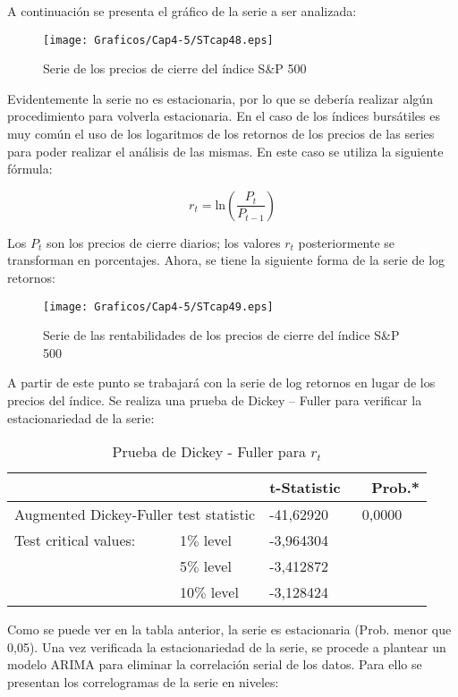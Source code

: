 A continuaci\'{o}n se presenta el gr\'{a}fico de la serie a ser analizada:

\begin{figure}[H]
\centering
\texttt{[image: Graficos/Cap4-5/STcap48.eps]}
\caption{Serie de los precios de cierre del \'{i}ndice S{\&}P 500}
\end{figure}

Evidentemente la serie no es estacionaria, por lo que se deber\'{i}a realizar alg\'{u}n procedimiento para volverla estacionaria. En el caso de los \'{i}ndices burs\'{a}tiles es muy com\'{u}n el uso de los logaritmos de los retornos de los precios de las series para poder realizar el an\'{a}lisis de las mismas. En este caso se utiliza la siguiente f\'{o}rmula:

\[
r_{t}=\mathrm{ln}\left( \frac{P_{t}}{P_{t-1}} \right)
\]

Los $P_{t}$ son los precios de cierre diarios; los valores $r_{t}$ posteriormente se transforman en porcentajes. Ahora, se tiene la siguiente forma de la serie de log retornos:

\begin{figure}[H]
\centering
\texttt{[image: Graficos/Cap4-5/STcap49.eps]}
\caption{Serie de las rentabilidades de los precios de cierre del \'{i}ndice S{\&}P 500}
\end{figure}

A partir de este punto se trabajar\'{a} con la serie de log retornos en lugar de los precios del \'{i}ndice. Se realiza una prueba de Dickey -- Fuller para verificar la estacionariedad de la serie:

\begin{table}[H]
\centering
\begin{tabular}{p{110pt}p{70pt}ll}\hline\hline
& & t-Statistic & ~~Prob.* \\ \hline \hline
\multicolumn{2}{l}{Augmented Dickey-Fuller test statistic} & -41,62920 & ~0,0000 \\ \hline
Test critical values: & 1$\%$ level & -3,964304 & \\
& 5$\%$ level & -3,412872 & \\
& 10$\%$ level & -3,128424 & \\ \hline \hline
\end{tabular}
\caption{Prueba de Dickey - Fuller para $r_t$}
\end{table}

Como se puede ver en la tabla anterior, la serie es estacionaria (Prob. menor que 0,05). Una vez verificada la estacionariedad de la serie, se procede a plantear un modelo ARIMA para eliminar la correlaci\'{o}n serial de los datos. Para ello se presentan los correlogramas de la serie en niveles:

